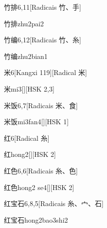 \begin{entry}{竹排}{6,11}[Radicais ⽵、⼿]
  \begin{phonetics}{竹排}{zhu2pai2}
  \end{phonetics}
\end{entry}

\begin{entry}{竹编}{6,12}[Radicais ⽵、⽷]
  \begin{phonetics}{竹编}{zhu2bian1}
  \end{phonetics}
\end{entry}

\begin{entry}{米}{6}[Kangxi 119][Radical ⽶]
  \begin{phonetics}{米}{mi3}[][HSK 2,3]
  \end{phonetics}
\end{entry}

\begin{entry}{米饭}{6,7}[Radicais ⽶、⾷]
  \begin{phonetics}{米饭}{mi3fan4}[][HSK 1]
  \end{phonetics}
\end{entry}

\begin{entry}{红}{6}[Radical ⽷]
  \begin{phonetics}{红}{hong2}[][HSK 2]
  \end{phonetics}
\end{entry}

\begin{entry}{红色}{6,6}[Radicais ⽷、⾊]
  \begin{phonetics}{红色}{hong2 se4}[][HSK 2]
  \end{phonetics}
\end{entry}

\begin{entry}{红宝石}{6,8,5}[Radicais ⽷、⼧、⽯]
  \begin{phonetics}{红宝石}{hong2bao3shi2}
  \end{phonetics}
\end{entry}

